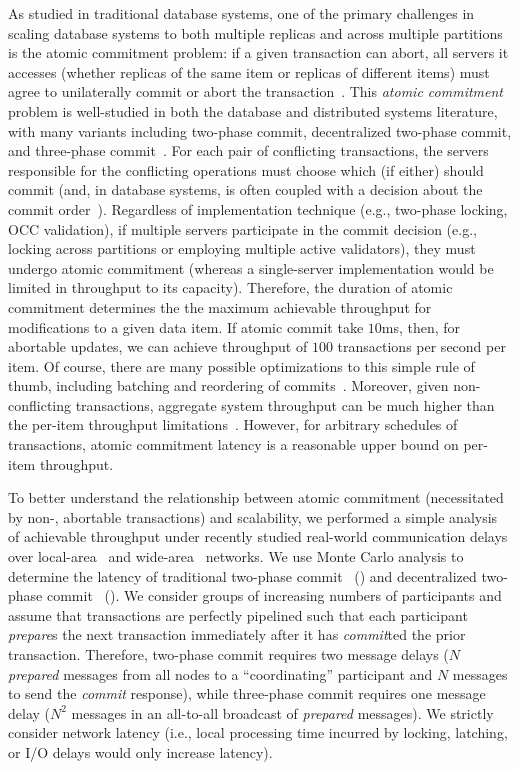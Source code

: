 As studied in traditional database systems, one of the primary
challenges in scaling database systems to both multiple replicas and
across multiple partitions is the atomic commitment problem: if a
given transaction can abort, all servers it accesses (whether replicas
of the same item or replicas of different items) must agree to
unilaterally commit or abort the
transaction~\cite{bernstein-book}. This \textit{atomic commitment}
problem is well-studied in both the database and distributed systems
literature, with many variants including two-phase commit,
decentralized two-phase commit, and three-phase
commit~\cite{atomictransactions,paxos-commit,traiger-tods}. For each
pair of conflicting transactions, the servers responsible for the
conflicting operations must choose which (if either) should commit
(and, in database systems, is often coupled with a decision about the
commit order~\cite{hat-vldb,calvin,traiger-tods}). Regardless of
implementation technique (e.g., two-phase locking, OCC validation), if
multiple servers participate in the commit decision (e.g., locking
across partitions or employing multiple active validators), they must
undergo atomic commitment (whereas a single-server implementation
would be limited in throughput to its capacity). Therefore, the
duration of atomic commitment determines the the maximum achievable
throughput for modifications to a given data item. If atomic commit
take $10$ms, then, for abortable updates, we can achieve throughput of
$100$ transactions per second per item. Of course, there are many
possible optimizations to this simple rule of thumb, including
batching and reordering of commits~\cite{calvin}. Moreover, given
non-conflicting transactions, aggregate system throughput can be much
higher than the per-item throughput limitations~\cite{spanner,
  f1}. However, for arbitrary schedules of transactions, atomic
commitment latency is a reasonable upper bound on per-item throughput.

To better understand the relationship between atomic commitment
(necessitated by non-\iconfluent, abortable transactions) and
scalability, we performed a simple analysis of achievable throughput
under recently studied real-world communication delays over
local-area~\cite{bobtail} and wide-area~\cite{hat-vldb} networks. We
use Monte Carlo analysis to determine the latency of traditional
two-phase commit~\cite{bernstein-book} (\dpc) and decentralized
two-phase commit~\cite{paxos-commit} (\cpc). We consider groups of
increasing numbers of participants and assume that transactions are
perfectly pipelined such that each participant \textit{prepare}s the
next transaction immediately after it has \textit{commit}ted the prior
transaction. Therefore, two-phase commit requires two message delays
($N$ \textit{prepared} messages from all nodes to a ``coordinating''
participant and $N$ messages to send the \textit{commit} response),
while three-phase commit requires one message delay ($N^2$ messages in
an all-to-all broadcast of \textit{prepared} messages). We strictly
consider network latency (i.e., local processing time incurred by
locking, latching, or I/O delays would only increase latency).

